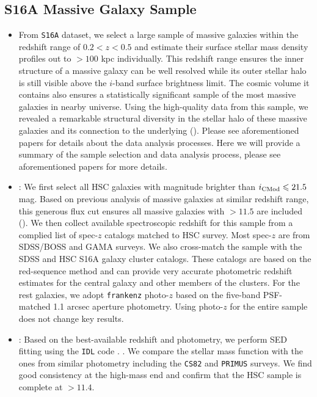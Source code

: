 \documentclass[a4paper,fleqn,usenatbib]{mnras}
\begin{document}
\subsection{S16A Massive Galaxy Sample}
    \label{sec:sample}

	\begin{itemize}

		\item From \texttt{S16A} dataset, we select a large sample of massive galaxies
			within the redshift range of $0.2 < z < 0.5$ and estimate their surface
			stellar mass density profiles out to $>100$ kpc individually.
			This redshift range ensures the inner structure of a massive galaxy can be
			well resolved while its outer stellar halo is still visible above the $i$-band
			surface brightness limit.
			The cosmic volume it contains also ensures a statistically significant sample
			of the most massive galaxies in nearby universe.
			Using the high-quality data from this sample, we revealed a remarkable structural
			diversity in the stellar halo of these massive galaxies and its connection to
			the underlying \mhalo{} (\addref{}).
			Please see aforementioned papers for details about the data analysis processes.
			Here we will provide a summary of the sample selection and data analysis
			process, please see aforementioned papers for more details.

		\item {}: We first select all HSC galaxies with \cmodel{} magnitude
			brighter than $i_{\rm CMod} \leq 21.5$ mag. Based on previous analysis of massive
			galaxies at similar redshift range, this generous flux cut ensures all massive
			galaxies with \mstar{}$>11.5$ are included (\addref{}).
			We then collect available spectroscopic redshift for this sample from a complied
			list of spec-$z$ catalogs matched to HSC survey.
			Most spec-$z$ are from SDSS/BOSS and GAMA surveys.
			We also cross-match the sample with the SDSS \redm{} and HSC S16A \camira{}
			galaxy cluster catalogs.
			These catalogs are based on the red-sequence method and can provide very accurate
			photometric redshift estimates for the central galaxy and other members of the
			clusters.
            For the rest galaxies, we adopt \texttt{frankenz} photo-$z$ based on the five-band
            PSF-matched 1.1 arcsec aperture photometry.
            Using photo-$z$ for the entire sample does not change key results.

		\item {}: Based on the best-available redshift and \cmodel{} photometry,
			we perform SED fitting using the \texttt{IDL} code \ised{}.
			.
			We compare the \mcmodel{} stellar mass function with the ones from similar
			photometry including the \texttt{CS82} and \texttt{PRIMUS} surveys.
			We find good consistency at the high-mass end and confirm that the HSC
			sample is complete at \mcmodel{}$>11.4$.

	\end{itemize}
\end{document}
